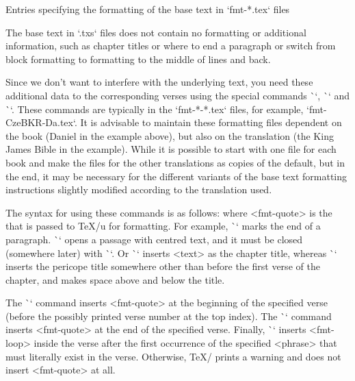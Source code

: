 \secc[fmt] Entries specifying the formatting of the base text in `fmt-*.tex` files

The base text in `.txs` files does not contain
no formatting or additional information, such as chapter titles
or where to end a paragraph or switch from block formatting to
formatting to the middle of lines and back.

Since we don't want to interfere with the underlying text,  you need these additional
data to the corresponding verses using the special commands \`\fmtadd`,
\`\fmtpre` and \`\fmtins`. These commands are typically in the `fmt-*-*.tex` files,
for example, `fmt-CzeBKR-Da.tex`. It is advisable to maintain these formatting files
dependent on the book (Daniel in the example above), but also on the
translation (the King James Bible in the example). While it is possible to start with one file
for each book and make the files for the other translations as copies of the default,
but in the end, it may be necessary for the different variants of the base text
formatting instructions slightly modified according to the translation used.

The syntax for using these commands is as follows:
\begtt
{}
\endtt
where <fmt-quote> is the  that is passed to \TeX/u for formatting.
For example, \`\endgraf` marks the end of a paragraph. \`\begcenter` opens a passage with
centred text, and it must be closed (somewhere later) with \`\endcenter`. Or 
\`` inserts <text> as the chapter title, whereas
\`` inserts the pericope title somewhere other than before the first verse of the chapter, and makes space above and below the title.

The \`\fmtpre` command inserts <fmt-quote>
at the beginning of the specified verse (before the possibly printed verse number at the top
index). The \`\fmtadd` command inserts <fmt-quote> at the end of the specified verse.
Finally, \`\fmtins` inserts <fmt-loop> inside the verse after the first occurrence of the specified
<phrase> that must literally exist in the verse. Otherwise, \TeX/ prints a warning
and does not insert <fmt-quote> at all.

